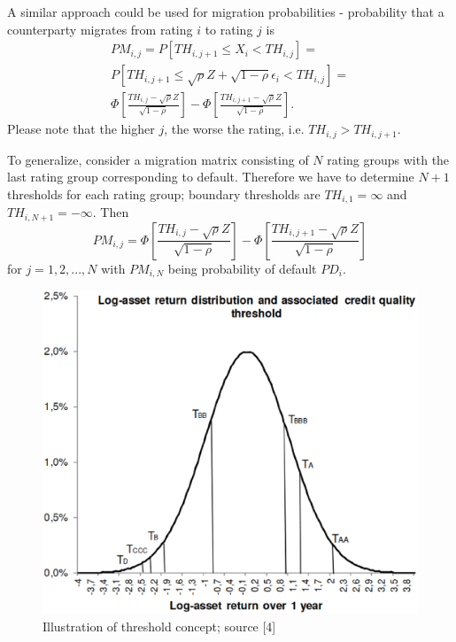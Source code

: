 \documentclass[a4paper]{article}
\begin{document}
A similar approach could be used for migration 
probabilities - probability that a counterparty migrates from rating 
$i$ to rating $j$ is
\begin{multline}
PM_{i,j} = P[TH_{i, j + 1} \le X_i < TH_{i, j}] =\\
P[TH_{i, j + 1} \le \sqrt{\rho}Z + \sqrt{1 - \rho} \epsilon_i < TH_{i, j}]=\\
\Phi\left[\frac{TH_{i, j} - \sqrt{\rho}Z}{\sqrt{1 - 
\rho}}\right] - \Phi\left[\frac{TH_{i, j + 1} - \sqrt{\rho}Z}{\sqrt{1 - 
\rho}}\right].
\end{multline}
Please note that the higher $j$, the worse the rating, i.e. $TH_{i, j} 
> TH_{i, j + 1}$.

To generalize, consider a migration matrix consisting of $N$ rating groups with 
the last rating group corresponding to default. Therefore we have to determine $N + 1$ thresholds for each rating 
group; boundary thresholds are $TH_{i, 1} = 
\infty$ and $TH_{i, N + 1} = -\infty$. Then
\begin{equation}
PM_{i,j} = \Phi\left[\frac{TH_{i, j} - \sqrt{\rho}Z}{\sqrt{1 - 
\rho}}\right] - \Phi\left[\frac{TH_{i, j + 1} - \sqrt{\rho}Z}{\sqrt{1 - 
\rho}}\right]
\end{equation}
for $j = 1, 2, ..., N$ with $PM_{i, N}$ being probability of default 
$PD_i$.

\begin{figure}[htp]
\centering
\includegraphics[scale = 0.35]{pictures/thresholds.eps}
\caption{Illustration of threshold concept; source [4]}
\label{thresholds}
\end{figure}
\end{document}
